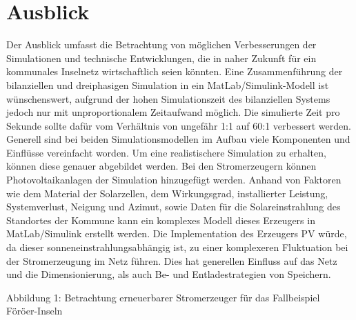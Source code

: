 \chapter{Ausblick}

Der Ausblick umfasst die Betrachtung von möglichen Verbesserungen der Simulationen und technische Entwicklungen, die in naher Zukunft für ein kommunales Inselnetz wirtschaftlich seien könnten.
Eine Zusammenführung der bilanziellen und dreiphasigen Simulation in ein MatLab/Simulink-Modell ist wünschenswert, aufgrund der hohen Simulationszeit des bilanziellen Systems jedoch nur mit unproportionalem Zeitaufwand möglich.
Die simulierte Zeit pro Sekunde sollte dafür vom Verhältnis von ungefähr 1:1 auf 60:1 verbessert werden.
Generell sind bei beiden Simulationsmodellen im Aufbau viele Komponenten und Einflüsse vereinfacht worden. 
Um eine realistischere Simulation zu erhalten, können diese genauer abgebildet werden.
Bei den Stromerzeugern können Photovoltaikanlagen der Simulation hinzugefügt werden.
Anhand von Faktoren wie dem Material der Solarzellen, dem Wirkungsgrad, installierter Leistung, Systemverlust, Neigung und Azimut, sowie Daten für die Solareinstrahlung des Standortes der Kommune kann ein komplexes Modell dieses Erzeugers in MatLab/Simulink erstellt werden.
Die Implementation des Erzeugers PV würde, da dieser sonneneinstrahlungsabhängig ist, zu einer komplexeren Fluktuation bei der Stromerzeugung im Netz führen. 
Dies hat generellen Einfluss auf das Netz und die Dimensionierung, als auch Be- und Entladestrategien von Speichern.
  
Abbildung 1: Betrachtung erneuerbarer Stromerzeuger für das Fallbeispiel Föröer-Inseln

